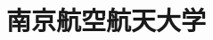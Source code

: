 \documentclass{exam-zh}
\title{南京航空航天大学}
\begin{document}
\maketitle




{
    
    
}{}

\def\Auther{24bit-xjkp}
\def\AutherEmail{2283572185@qq.com}


\end{document}
